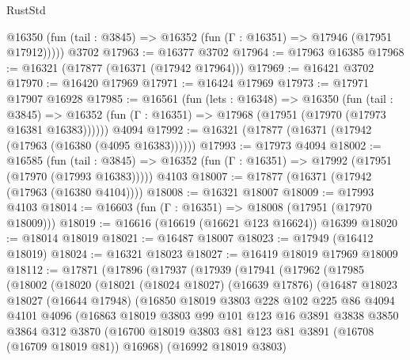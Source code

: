 \begin{lexlean}{RustStd}
\begin{coremodule}
      @16350 (fun (tail : @3845) => @16352 (fun (Γ : @16351) => @17946 (@17951 @17912)))))
    @3702
@17963 := @16377 @3702
@17964 := @17963 @16385
@17968 := @16321 (@17877 (@16371 (@17942 @17964)))
@17969 := @16421 @3702
@17970 := @16420 @17969
@17971 := @16424 @17969
@17973 := @17971 @17907 @16928
@17985 := @16561
    (fun (lets : @16348) =>
    @16350
      (fun (tail : @3845) =>
      @16352 (fun (Γ : @16351) => @17968 (@17951 (@17970 (@17973 @16381 @16383))))))
    @4094
@17992 := @16321 (@17877 (@16371 (@17942 (@17963 (@16380 (@4095 @16383))))))
@17993 := @17973 @4094
@18002 := @16585
    (fun (tail : @3845) => @16352 (fun (Γ : @16351) => @17992 (@17951 (@17970 (@17993 @16383)))))
    @4103
@18007 := @17877 (@16371 (@17942 (@17963 (@16380 @4104))))
@18008 := @16321 @18007
@18009 := @17993 @4103
@18014 := @16603 (fun (Γ : @16351) => @18008 (@17951 (@17970 @18009)))
@18019 := @16616 (@16619 (@16621 @123 @16624)) @16399
@18020 := @18014 @18019
@18021 := @16487 @18007
@18023 := @17949 (@16412 @18019)
@18024 := @16321 @18023
@18027 := @16419 @18019 @17969 @18009
@18112 := @17871
    (@17896
      (@17937
        (@17939
          (@17941
            (@17962
              (@17985
                (@18002
                  (@18020
                    (@18021
                      (@18024 @18027)
                      (@16639 @17876)
                      (@16487
                        @18023
                        @18027
                        (@16644 @17948)
                        (@16850
                          @18019
                          @3803
                          @228
                          @102
                          @225
                          @86
                          @4094
                          @4101
                          @4096
                          (@16863
                            @18019
                            @3803
                            @99
                            @101
                            @123
                            @16
                            @3891
                            @3838
                            @3850
                            @3864
                            @312
                            @3870
                            (@16700
                              @18019
                              @3803
                              @81
                              @123
                              @81
                              @3891
                              (@16708 (@16709 @18019 @81))
                              @16968)
                            (@16992 @18019 @3803)

\end{coremodule}
\end{lexlean}
